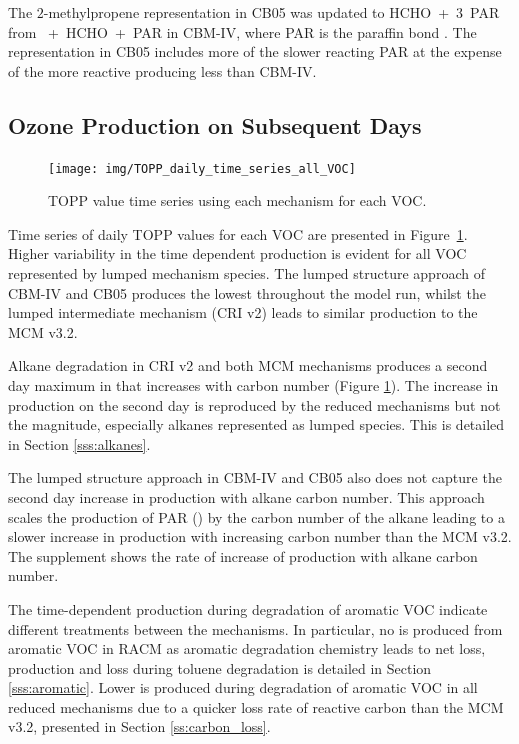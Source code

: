 The $2$-methylpropene representation in CB05 was updated to \mbox{HCHO + $3$ PAR} from \mbox{ + HCHO + PAR} in CBM-IV, where PAR is the paraffin  bond \citep{Gery:1989, Yarwood:2005}.
The representation in CB05 includes more of the slower reacting PAR at the expense of the more reactive  producing less  than CBM-IV.

\subsection{Ozone Production on Subsequent Days} \label{ss:profiles} %

\begin{figure}
    \centering
    \texttt{[image: img/TOPP\_daily\_time\_series\_all\_VOC]}
    \vspace{0mm}
    \caption{TOPP value time series using each mechanism for each VOC.}
    \vspace{-4mm}
    \label{f:TOPP_dailies}
\end{figure}

Time series of daily TOPP values for each VOC are presented in \mbox{Figure \ref{f:TOPP_dailies}}. 
Higher variability in the time dependent  production is evident for all VOC represented by lumped mechanism species.
The lumped structure approach of CBM-IV and CB05 produces the lowest  throughout the model run, whilst the lumped intermediate mechanism (CRI v2) leads to similar  production to the MCM v3.2.

Alkane degradation in CRI v2 and both MCM mechanisms produces a second day maximum in  that increases with carbon number (Figure \ref{f:TOPP_dailies}).
The increase in  production on the second day is reproduced by the reduced mechanisms but not the magnitude, especially alkanes represented as lumped species.
This is detailed in Section \ref{sss:alkanes}.

The lumped structure approach in CBM-IV and CB05 also does not capture the second day increase in  production with alkane carbon number.
This approach scales the  production of PAR () by the carbon number of the alkane leading to a slower increase in  production with increasing carbon number than the MCM v3.2.
The supplement shows the rate of increase of  production with alkane carbon number.

The time-dependent  production during degradation of aromatic VOC indicate different treatments between the mechanisms.
In particular, no  is produced from aromatic VOC in RACM as aromatic degradation chemistry leads to net  loss,  production and loss during toluene degradation is detailed in Section \ref{sss:aromatic}.
Lower  is produced during degradation of aromatic VOC in all reduced mechanisms due to a quicker loss rate of reactive carbon than the MCM v3.2, presented in Section \ref{ss:carbon_loss}.

